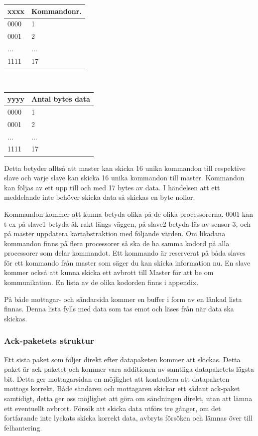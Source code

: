 \documentclass[a4paper,12pt,fleqn]{article}
\begin{document}
 \begin{tabular}{| p{3cm} | p{3.5cm} |}
	    \hline
		\textbf{xxxx} & \textbf{Kommandonr.} \\ \hline
		0000 & 1 \\ \hline
		0001 & 2 \\ \hline
		... & ... \\ \hline
		1111 & 17 \\ \hline
	    \end{tabular}
		\\

 \begin{tabular}{| p{3cm} | p{3.5cm} |}
	    \hline
		\textbf{yyyy} & \textbf{Antal bytes data} \\ \hline
		0000 & 1 \\ \hline
		0001 & 2 \\ \hline
		... & ... \\ \hline
		1111 & 17 \\ \hline
	    \end{tabular}
		\vspace{0.5cm}
		
		Detta betyder alltså att master kan skicka 16 unika kommandon till respektive slave och varje slave kan skicka 16 unika kommandon till master. Kommandon kan följas av ett upp till och med 17 bytes av data. I händelsen att ett meddelande inte behöver skicka data så skickas en byte nollor.


		Kommandon kommer att kunna betyda olika på de olika processorerna. 0001 kan t ex på slave1 betyda åk rakt längs väggen, på slave2 betyda läs av sensor 3, och på master uppdatera kartabstraktion med följande värden. Om likadana kommandon finns på flera processorer så ska de ha samma kodord på alla processorer som delar kommandot. Ett kommando är reserverat på båda slaves för ett kommando från master som säger du kan skicka information nu. En slave kommer också att kunna skicka ett avbrott till Master för att be om kommunikation. En lista av de olika kodorden finns i appendix. 
		
		På både mottagar- och sändarsida kommer en buffer i form av en länkad lista finnas. Denna lista fylls med data som tas emot och läses från när data ska skickas. 

\subsubsection{Ack-paketets struktur}
Ett sista paket som följer direkt efter datapaketen kommer att skickas. Detta paket är ack-paketet och kommer vara additionen av samtliga datapaketets lägsta bit. Detta ger mottagarsidan en möjlighet att kontrollera att datapaketen mottogs korrekt.
Både sändaren och mottagaren skickar ett sådant ack-paket samtidigt, detta ger oss möjlighet att göra om sändningen direkt, utan att lämna ett eventuellt avbrott. Försök att skicka data utförs tre gånger, om det fortfarande inte lyckats skicka korrekt data, avbryts försöken och lämnas över till felhantering. 
\end{document}
